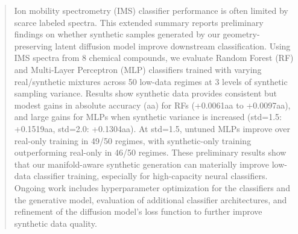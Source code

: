 \documentclass[conference]{IEEEtran}
\begin{document}
\begin{abstract}

Ion mobility spectrometry (IMS) classifier performance is often limited by scarce labeled spectra. This extended summary reports preliminary findings on whether synthetic samples generated by our geometry-preserving latent diffusion model improve downstream classification. Using IMS spectra from 8 chemical compounds, we evaluate Random Forest (RF) and Multi-Layer Perceptron (MLP) classifiers trained with varying real/synthetic mixtures across 50 low-data regimes at 3 levels of synthetic sampling variance. Results show synthetic data provides consistent but modest gains in absolute accuracy (aa) for RFs (+0.0061aa to +0.0097aa), and large gains for MLPs when synthetic variance is increased (std=1.5: +0.1519aa, std=2.0: +0.1304aa). At std=1.5, untuned MLPs improve over real-only training in 49/50 regimes, with synthetic-only training outperforming real-only in 46/50 regimes. These preliminary results show that our manifold-aware synthetic generation can materially improve low-data classifier training, especially for high-capacity neural classifiers. Ongoing work includes hyperparameter optimization for the classifiers and the generative model, evaluation of additional classifier architectures, and refinement of the diffusion model's loss function to further improve synthetic data quality.
\end{abstract}
\end{document}
